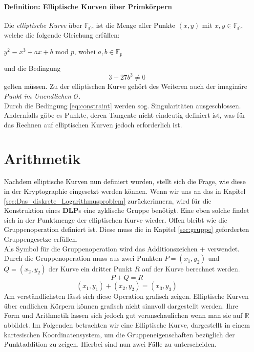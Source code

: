 \paragraph{Definition: Elliptische Kurven über Primkörpern}
Die \textit{elliptische Kurve} über $\mathbb{F_p}$, ist die Menge aller Punkte $(x,y)$ mit $x,y \in \mathbb{F_p}$, welche die folgende Gleichung erfüllen: 
\begin{center}
$y^2 \equiv x^3 + ax + b$ mod $p$, wobei $a,b \in \mathbb{F}_p$
\end{center} 
und die Bedingung
\begin{equation}
3 + 27b^3 \neq 0
\label{eq:constraint}
\end{equation} gelten müssen. Zu der elliptischen Kurve gehört des Weiteren auch der imaginäre \textit{Punkt im Unendlichen} $\mathcal{O}$.\\

Durch die Bedingung \ref{eq:constraint} werden sog. Singularitäten ausgeschlossen. Andernfalls gäbe es Punkte, deren Tangente nicht eindeutig definiert ist, was für das Rechnen auf elliptischen Kurven jedoch erforderlich ist.\cite[273-276]{Paar.2016}

\section{Arithmetik} \label{sec:Arithmetik}
Nachdem elliptische Kurven nun definiert wurden, stellt sich die Frage, wie diese in der Kryptographie eingesetzt werden können. Wenn wir uns an das in Kapitel \ref{sec:Das_diskrete_Logarithmusproblem} zurückerinnern, wird für die Konstruktion eines \textbf{DLP}s eine zyklische Gruppe benötigt. Eine eben solche findet sich in der Punktmenge der elliptischen Kurve wieder. Offen bleibt wie die Gruppenoperation definiert ist. Diese muss die in Kapitel \ref{sec:gruppe} geforderten Gruppengesetze erfüllen.\\

Als Symbol für die Gruppenoperation wird das Additionszeichen $+$ verwendet. Durch die Gruppenoperation muss aus zwei Punkten $P = (x_1, y_2)$ und $Q= (x_2, y_2)$ der Kurve ein dritter Punkt $R$ auf der Kurve berechnet werden. 
$$P + Q = R$$ $$(x_1, y_1) +  (x_2, y_2) = (x_3, y_3)$$
Am verständlichsten lässt sich diese Operation grafisch zeigen. Elliptische Kurven über endlichen Körpern können grafisch nicht sinnvoll dargestellt werden. Ihre Form und Arithmetik lassen sich jedoch gut veranschaulichen wenn man sie auf $\mathbb{R}$ abbildet. Im Folgenden betrachten wir eine Elliptische Kurve, dargestellt in einem kartesischen Koordinatensystem, um die Gruppeneigenschaften bezüglich der Punktaddition zu zeigen. Hierbei sind nun zwei Fälle zu unterscheiden.\\

